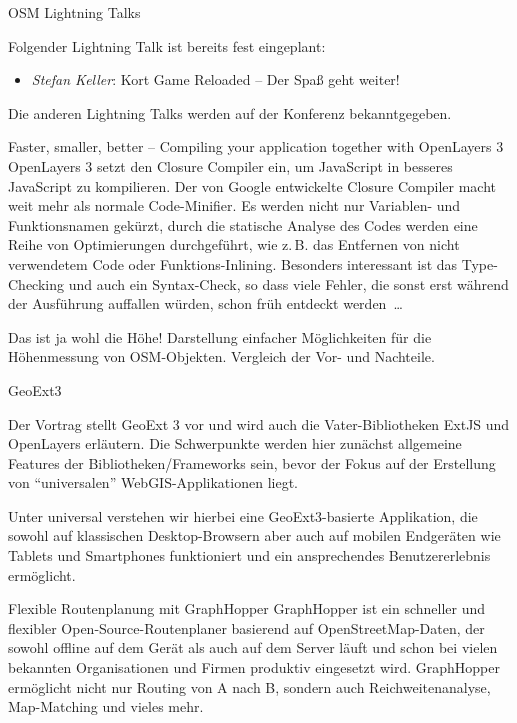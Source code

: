 \abstractGiStudio{}%
{OSM Lightning Talks}%
{}%
{Folgender Lightning Talk ist bereits fest eingeplant:
	\begin{itemize}
		\RaggedRight
		\setlength{\itemsep}{-2pt} %
		\item \emph{Stefan Keller}: Kort Game Reloaded -- Der Spaß geht weiter!
	\end{itemize}
	\justifying
Die anderen Lightning Talks werden auf der Konferenz bekanntgegeben.
}

%
{Faster, smaller, better -- Compiling your application together with OpenLayers 3}%
{}%
{OpenLayers 3 setzt den Closure Compiler ein, um Java\-Script in besseres JavaScript zu kompilieren.
Der von Google entwickelte Closure Compiler macht weit mehr als normale Code-Minifier.
Es werden nicht nur Variablen- und Funk\-tionsnamen gekürzt, durch die statische Analyse
des Codes werden eine Reihe von Optimierungen durchgeführt, wie z.\,B. das Entfernen
von nicht verwendetem Code oder Funktions-Inlining. Besonders interessant ist das
Type-Checking und auch ein Syntax-Check, so dass viele Fehler, die sonst erst während
der Ausführung auffallen würden, schon früh entdeckt werden~\dots}

%
{Das ist ja wohl die Höhe!}%
{}%
{Darstellung einfacher Möglichkeiten für die Höhenmessung von OSM-Objekten. Vergleich der Vor- und Nachteile.}

%
{GeoExt3}%
{}%
{Der Vortrag stellt GeoExt 3 vor und wird auch die Vater-Bibliotheken ExtJS
und OpenLayers erläutern. Die Schwer\-punkte werden hier zunächst allgemeine
Features der Bibliotheken/Frameworks sein, bevor der Fokus auf der Erstellung
von "`universalen"' WebGIS-Applikationen liegt.

Unter universal verstehen wir
hierbei eine GeoExt3-basierte Applikation, die sowohl auf klassischen
Desktop-Browsern aber auch auf mobilen Endgeräten wie Tablets und Smartphones
funktioniert und ein ansprechendes Benutzererlebnis ermöglicht.}

%
{Flexible Routenplanung mit GraphHopper}%
{}%
{GraphHopper ist ein schneller und flexibler Open-Source-Routenplaner basierend auf OpenStreetMap-Daten,
der sowohl offline auf dem Gerät als auch auf dem Server läuft und schon bei vielen bekannten Organisationen
und Firmen produktiv eingesetzt wird. GraphHopper ermöglicht nicht nur Routing von A nach B, sondern auch
Reichweitenanalyse, Map-Matching und vieles mehr.}

